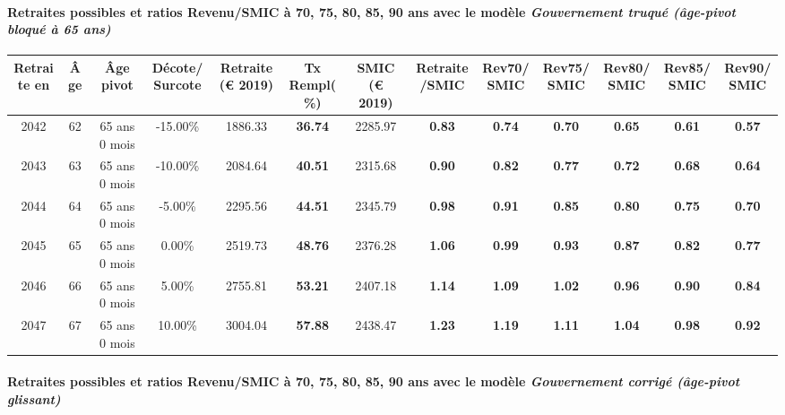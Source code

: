 \paragraph{Retraites possibles et ratios Revenu/SMIC à 70, 75, 80, 85, 90 ans avec le modèle \emph{Gouvernement truqué (âge-pivot bloqué à 65 ans)}}  
 
{ \scriptsize \begin{center} 
\begin{tabular}[htb]{|c|c||c|c||c|c||c||c|c|c|c|c|c|} 
\hline 
 Retraite en &  Âge &  Âge pivot &  Décote/Surcote &  Retraite (\euro{} 2019) &  Tx Rempl(\%) &  SMIC (\euro{} 2019) &  Retraite/SMIC &  Rev70/SMIC &  Rev75/SMIC &  Rev80/SMIC &  Rev85/SMIC &  Rev90/SMIC \\ 
\hline \hline 
 2042 &  62 &  65 ans 0 mois &  -15.00\% &  1886.33 &  {\bf 36.74} &  2285.97 &  {\bf {\color{red} 0.83}} &  {\bf {\color{red} 0.74}} &  {\bf {\color{red} 0.70}} &  {\bf {\color{red} 0.65}} &  {\bf {\color{red} 0.61}} &  {\bf {\color{red} 0.57}} \\ 
\hline 
 2043 &  63 &  65 ans 0 mois &  -10.00\% &  2084.64 &  {\bf 40.51} &  2315.68 &  {\bf {\color{red} 0.90}} &  {\bf {\color{red} 0.82}} &  {\bf {\color{red} 0.77}} &  {\bf {\color{red} 0.72}} &  {\bf {\color{red} 0.68}} &  {\bf {\color{red} 0.64}} \\ 
\hline 
 2044 &  64 &  65 ans 0 mois &  -5.00\% &  2295.56 &  {\bf 44.51} &  2345.79 &  {\bf {\color{red} 0.98}} &  {\bf {\color{red} 0.91}} &  {\bf {\color{red} 0.85}} &  {\bf {\color{red} 0.80}} &  {\bf {\color{red} 0.75}} &  {\bf {\color{red} 0.70}} \\ 
\hline 
 2045 &  65 &  65 ans 0 mois &  0.00\% &  2519.73 &  {\bf 48.76} &  2376.28 &  {\bf 1.06} &  {\bf {\color{red} 0.99}} &  {\bf {\color{red} 0.93}} &  {\bf {\color{red} 0.87}} &  {\bf {\color{red} 0.82}} &  {\bf {\color{red} 0.77}} \\ 
\hline 
 2046 &  66 &  65 ans 0 mois &  5.00\% &  2755.81 &  {\bf 53.21} &  2407.18 &  {\bf 1.14} &  {\bf 1.09} &  {\bf 1.02} &  {\bf {\color{red} 0.96}} &  {\bf {\color{red} 0.90}} &  {\bf {\color{red} 0.84}} \\ 
\hline 
 2047 &  67 &  65 ans 0 mois &  10.00\% &  3004.04 &  {\bf 57.88} &  2438.47 &  {\bf 1.23} &  {\bf 1.19} &  {\bf 1.11} &  {\bf 1.04} &  {\bf {\color{red} 0.98}} &  {\bf {\color{red} 0.92}} \\ 
\hline 
\hline 
\end{tabular} 
\end{center} } 
\paragraph{Retraites possibles et ratios Revenu/SMIC à 70, 75, 80, 85, 90 ans avec le modèle \emph{Gouvernement corrigé (âge-pivot glissant)}}  
 

